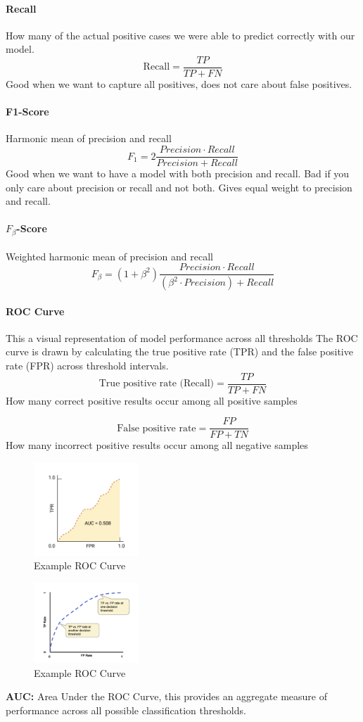 \documentclass[11pt]{article}
\begin{document}
\paragraph*{Recall}
How many of the actual positive cases we were able
to predict correctly with our model.
\[
	\text{Recall} = \frac{TP}{TP + FN}
\]
Good when we want to capture all positives, does not care about false positives.

\paragraph*{F1-Score}
Harmonic mean of precision and recall
\[
	F_1 = 2\frac{Precision \cdot Recall}{Precision + Recall}
\]
Good when we want to have a model with both precision and recall. Bad if you only care about precision or recall and not both.
Gives equal weight to precision and recall.


\paragraph*{$F_\beta$-Score}
Weighted harmonic mean of precision and recall
\[
	F_\beta = (1+\beta^2)\frac{Precision \cdot Recall}{(\beta^2 \cdot Precision) + Recall}
\]


\paragraph*{ROC Curve}
This a visual representation of model performance across all thresholds
The ROC curve is drawn by calculating the true positive rate (TPR) and the false positive rate (FPR)
across threshold intervals.
\[
	\text{True positive rate (Recall)} = \frac{TP}{TP+FN}
\]
How many correct positive results occur among all positive samples

\[
	\text{False positive rate} = \frac{FP}{FP+TN}
\]
How many incorrect positive results occur among all negative samples


\begin{figure}[h]
	\centering
	\includegraphics[width=0.35\textwidth]{../imgs/auc.png} %
	\caption{Example ROC Curve}
\end{figure}

\begin{figure}[h]
	\centering
	\includegraphics[width=0.35\textwidth]{../imgs/roc.png} %
	\caption{Example ROC Curve}
\end{figure}

\textbf{AUC:} Area Under the ROC Curve, this provides an aggregate measure of performance across all possible classification thresholds.
\end{document}
